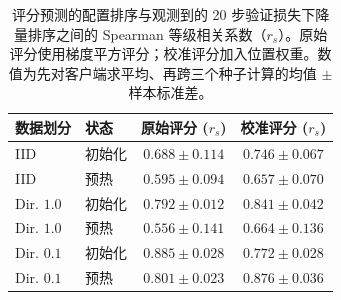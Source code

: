 \newcommand{\FMAdepthMin}{0.657}
\newcommand{\FMAdepthMax}{0.876}
\newcommand{\FMApositive}{90}
\newcommand{\FMAtotal}{90}
\newcommand{\FMAassociationSentence}{这些设置级的正相关支持在本受控协议中使用画像效用为配置确定优先级。}
\begin{table}[t]
\centering
\caption{评分预测的配置排序与观测到的 20 步验证损失下降量排序之间的 Spearman 等级相关系数（$r_s$）。原始评分使用梯度平方评分；校准评分加入位置权重。数值为先对客户端求平均、再跨三个种子计算的均值 $\pm$ 样本标准差。}
\label{tab:fm-score-reliability}
\small
\setlength{\tabcolsep}{3pt}
\begin{tabular}{@{}llcc@{}}
\toprule
数据划分 & 状态 & 原始评分 ($r_s$) & 校准评分 ($r_s$) \\
\midrule
IID & 初始化 & $0.688\pm0.114$ & $0.746\pm0.067$ \\
IID & 预热 & $0.595\pm0.094$ & $0.657\pm0.070$ \\
Dir. $1.0$ & 初始化 & $0.792\pm0.012$ & $0.841\pm0.042$ \\
Dir. $1.0$ & 预热 & $0.556\pm0.141$ & $0.664\pm0.136$ \\
Dir. $0.1$ & 初始化 & $0.885\pm0.028$ & $0.772\pm0.028$ \\
Dir. $0.1$ & 预热 & $0.801\pm0.023$ & $0.876\pm0.036$ \\
\bottomrule
\end{tabular}
\end{table}
